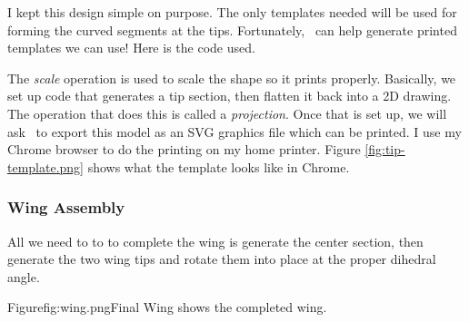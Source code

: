 I kept this design simple on purpose. The only templates needed will be used
for forming the curved segments at the tips. Fortunately, \osc\ can help
generate printed templates we can use! Here is the code used.


The {\it scale} operation is used to scale the shape so it prints properly.
Basically, we set up code that generates a tip section, then flatten it back
into a 2D drawing. The operation that does this is called a {\it projection}.
Once that is set up, we will ask \osc\ to export this model as an SVG graphics
file which can be printed. I use my Chrome browser to do the printing on my
home printer.  Figure \ref{fig:tip-template.png} shows what the template looks
like in Chrome.


\subsubsection{Wing Assembly}

All we need to to to complete the wing is generate the center section, then
generate the two wing tips and rotate them into place at the proper dihedral angle.

Figure{fig:wing.png}{Final Wing} shows the completed wing.



